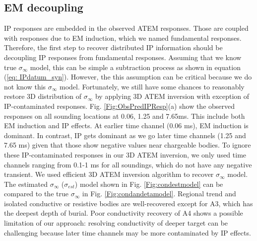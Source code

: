\documentclass[letterpaper,11pt]{article}
\newcommand{\siginf}{\sigma_\infty}
\begin{document}
\subsection{EM decoupling}
\label{subsec:emdecoupling}
IP responses are embedded in the observed ATEM responses. Those are coupled with responses due to EM induction, which we named fundamental responses. Therefore, the first step to recover distributed IP information should be decoupling IP responses from fundamental responses. Assuming that we know true $\siginf$ model, this can be simple a subtraction process as shown in equation (\ref{eq: IPdatum_syn}). However, the this assumption can be critical because we do not know this $\siginf$ model. Fortunately, we still have some chances to reasonably restore 3D distribution of $\siginf$ by applying 3D ATEM inversion with exception of IP-contaminated responses. Fig. \ref{Fig:ObsPredIPResp}(a) show the observed responses on all sounding locations at 0.06, 1.25 and 7.65ms. This include both EM induction and IP effects. At earlier time channel (0.06 ms), EM induction is dominant. In contrast, IP gets dominant as we go later time channels (1.25 and 7.65 ms) given that those show negative values near chargeable bodies. To ignore these IP-contaminated responses in our 3D ATEM inversion, we only used time channels ranging from 0.1-1 ms for all soundings, which do not have any negative transient. We used efficient 3D ATEM inversion algorithm \cite[]{yang20143} to recover $\siginf$ model. The estimated $\siginf$ ($\sigma_{est}$) model shown in Fig. \ref{Fig:condestmodel} can be compared to the true $\siginf$ in Fig. \ref{Fig:condandetamodel}. Regional trend and isolated conductive or resistive bodies are well-recovered except for A3, which has the deepest depth of burial. Poor conductivity recovery of A4 shows a possible limitation of our approach: resolving conductivity of deeper target can be challenging because later time channels may be more contaminated by IP effects. 
\end{document}
